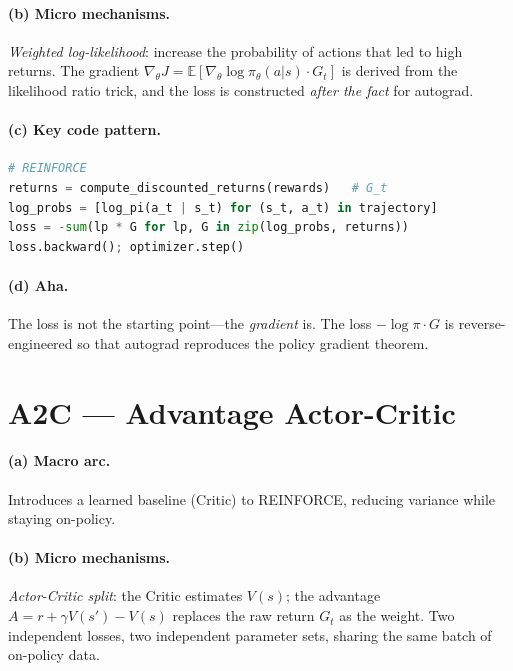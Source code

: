 \paragraph{(b) Micro mechanisms.}
\emph{Weighted log-likelihood}: increase the probability of actions that led to high returns.
The gradient $\nabla_\theta J = \mathbb{E}[\nabla_\theta\log\pi_\theta(a|s)\cdot G_t]$ is derived from the likelihood ratio trick, and the loss is constructed \emph{after the fact} for autograd.

\paragraph{(c) Key code pattern.}

\begin{lstlisting}[language=Python]
# REINFORCE
returns = compute_discounted_returns(rewards)   # G_t
log_probs = [log_pi(a_t | s_t) for (s_t, a_t) in trajectory]
loss = -sum(lp * G for lp, G in zip(log_probs, returns))
loss.backward(); optimizer.step()
\end{lstlisting}

\paragraph{(d) Aha.}
The loss is not the starting point---the \emph{gradient} is.
The loss $-\log\pi\cdot G$ is reverse-engineered so that autograd reproduces the policy gradient theorem.

\section{A2C --- Advantage Actor-Critic}
\label{sec:a2c}

\paragraph{(a) Macro arc.}
Introduces a learned baseline (Critic) to REINFORCE, reducing variance while staying on-policy.

\paragraph{(b) Micro mechanisms.}
\emph{Actor-Critic split}: the Critic estimates $V(s)$; the advantage $A = r + \gamma V(s') - V(s)$ replaces the raw return $G_t$ as the weight.
Two independent losses, two independent parameter sets, sharing the same batch of on-policy data.

